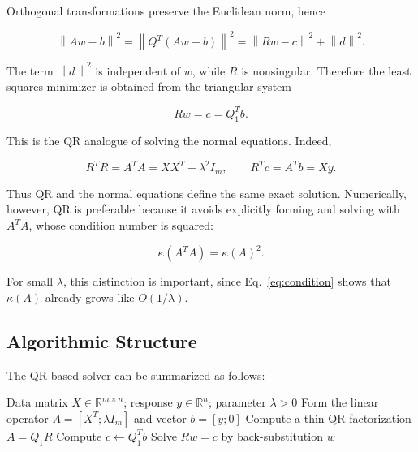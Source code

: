\documentclass[11pt,a4paper]{article}
\newcommand{\R}{\mathbb{R}}
\newcommand{\norm}[1]{\left\|#1\right\|}
\begin{document}
Orthogonal transformations preserve the Euclidean norm, hence

\begin{equation}
\label{eq:qr_residual_split}
    \norm{Aw-b}^2
    =
    \norm{Q^T(Aw-b)}^2
    =
    \norm{Rw-c}^2 + \norm{d}^2.
\end{equation}

The term $\norm{d}^2$ is independent of $w$, while $R$ is nonsingular. Therefore the 
least squares minimizer is obtained from the triangular system

\begin{equation}
\label{eq:qr_triangular_solve}
    Rw = c = Q_1^T b.
\end{equation}

This is the QR analogue of solving the normal equations. Indeed,

\begin{equation}
\label{eq:qr_normal_equivalence}
    R^T R = A^T A = XX^T + \lambda^2 I_m,
    \qquad
    R^T c = A^T b = Xy.
\end{equation}

Thus QR and the normal equations define the same exact solution. Numerically, however, 
QR is preferable because it avoids explicitly forming and solving with $A^T A$, whose 
condition number is squared:

\begin{equation}
    \kappa(A^T A) = \kappa(A)^2.
\end{equation}

For small $\lambda$, this distinction is important, since Eq.~\eqref{eq:condition} 
shows that $\kappa(A)$ already grows like $O(1/\lambda)$.

\subsection{Algorithmic Structure}

The QR-based solver can be summarized as follows:

\begin{algorithm}[H]
\caption{QR Solver for the Regularized Least Squares Problem}
\label{alg:qr_solver}
\begin{algorithmic}[1]
    \Require Data matrix $X\in\R^{m\times n}$; response $y\in\R^n$; parameter $\lambda>0$
    \State Form the linear operator $A = [X^T;\lambda I_m]$ and vector $b=[y;0]$
    \State Compute a thin QR factorization $A=Q_1R$
    \State Compute $c \gets Q_1^Tb$
    \State Solve $Rw=c$ by back-substitution
    \State \Return $w$
\end{algorithmic}
\end{algorithm}
\end{document}
